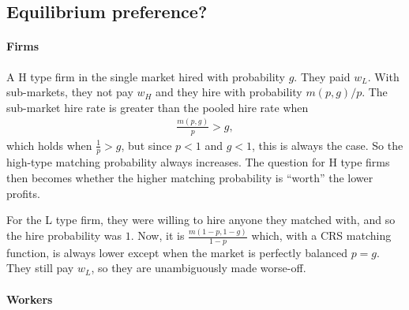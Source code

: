 \documentclass[12pt]{article}
\begin{document}


\subsection{Equilibrium preference?}

\paragraph{Firms}
A H type firm in the single market hired with probability $g$.
They paid $w_L$.
With sub-markets, they not pay $w_H$ and they hire with probability $m(p,g)/p$.
The sub-market hire rate is greater than the pooled hire rate when
\begin{align}
  \frac{m(p,g)}{p} > g,
\end{align}
which holds when $\frac{1}{p} > g$, but since $p < 1$ and $g < 1$, this is always the case.
So the high-type matching probability always increases. 
The question for H type firms then becomes whether the higher matching probability is ``worth'' the lower profits. 

For the L type firm, they were willing to hire anyone they matched with, and so the hire probability was $1$.
Now, it is $\frac{m(1 - p, 1 - g)}{1 - p}$ which, with a CRS matching function, is always lower except when the market is perfectly balanced $p = g$.
They still pay $w_L$, so they are unambiguously made worse-off.

\paragraph{Workers}
\end{document}

